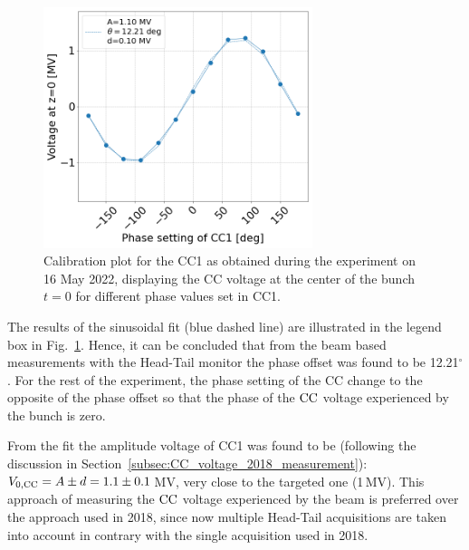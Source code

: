 

\begin{figure}[!h] %
   \centering         
   \includegraphics[width=0.7\textwidth]{images/Ch8/Vcc_at_z_zero_vs_inspector_phase_CC1_for_thesis_new_xlabel_may22.png}
       \caption{Calibration plot for the CC1 as obtained during the experiment on 16 May 2022, displaying the CC voltage at the center of the bunch $t=0$ for different phase values set in CC1.}
       \label{fig:Vcc_calibration_md_2022}
\end{figure}

The results of the sinusoidal fit (blue dashed line) are illustrated in the legend box in Fig.~\ref{fig:Vcc_calibration_md_2022}. Hence, it can be concluded that from the beam based measurements with the Head-Tail monitor the phase offset was found to be 12.21$^\circ$. For the rest of the experiment, the phase setting of the CC change to the opposite of the phase offset so that the phase of the ${\mathrm{CC}}$ voltage experienced by the bunch is zero. 


From the fit the amplitude voltage of CC1 was found to be (following the discussion in Section~\ref{subsec:CC_voltage_2018_measurement}): ${V_\mathrm{0, CC}}=A \pm d = 1.1 \pm 0.1$\,MV, very close to the targeted one (1\,MV). This approach of measuring the ${\mathrm{CC}}$ voltage experienced by the beam is preferred over the approach used in 2018, since now multiple Head-Tail acquisitions are taken into account in contrary with the single acquisition used in 2018.  



